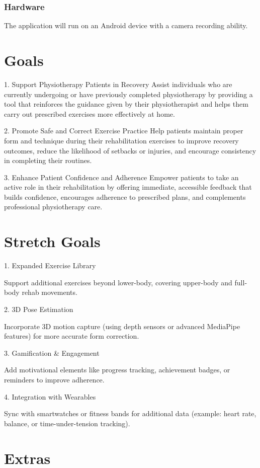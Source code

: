 \documentclass{article}
\begin{document}
  \subsubsection{Hardware}
    The application will run on an Android device with a camera recording ability.

\section{Goals}

1. Support Physiotherapy Patients in Recovery
Assist individuals who are currently undergoing or have previously completed physiotherapy by providing a tool that reinforces the guidance given by their physiotherapist and helps them carry out prescribed exercises more effectively at home.


2. Promote Safe and Correct Exercise Practice
Help patients maintain proper form and technique during their rehabilitation exercises to improve recovery outcomes, reduce the likelihood of setbacks or injuries, and encourage consistency in completing their routines.


3. Enhance Patient Confidence and Adherence
Empower patients to take an active role in their rehabilitation by offering immediate, accessible feedback that builds confidence, encourages adherence to prescribed plans, and complements professional physiotherapy care.
\section{Stretch Goals}

1. Expanded Exercise Library

Support additional exercises beyond lower-body, covering upper-body and full-body rehab movements.

2. 3D Pose Estimation

Incorporate 3D motion capture (using depth sensors or advanced MediaPipe features) for more accurate form correction.

3. Gamification & Engagement

Add motivational elements like progress tracking, achievement badges, or reminders to improve adherence.

4. Integration with Wearables

Sync with smartwatches or fitness bands for additional data (example: heart rate, balance, or time-under-tension tracking).


\section{Extras}
\end{document}
